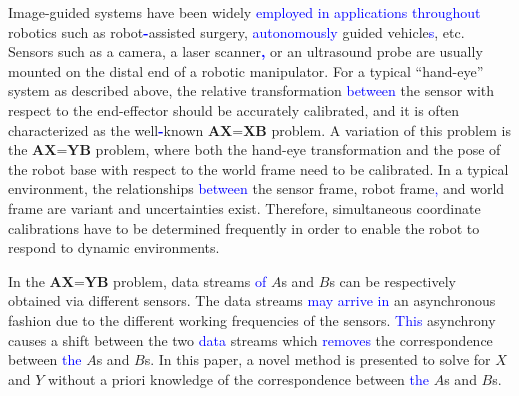 \documentclass[letterpaper, 10 pt, conference]{ieeeconf}  %
\begin{document}
Image-guided systems have been widely %
\textcolor{blue}{employed in applications throughout} %
robotics such as robot\textbf{\textcolor{blue}{-}}assisted surgery, %
\textcolor{blue}{autonomously} guided vehicle\textcolor{blue}{s}, etc. Sensors such as a camera, a laser scanner\textbf{\textcolor{blue}{,}} or an ultrasound probe are usually mounted on the distal end of a robotic manipulator. For a typical ``hand-eye'' system as described above, the relative transformation %
\textcolor{blue}{between} the sensor with respect to the end-effector should be accurately calibrated, and it is often characterized as the well\textbf{\textcolor{blue}{-}}known $\textbf{AX=XB}$ problem. A variation of this problem is the $\textbf{AX=YB}$ problem, where both the hand-eye transformation and the pose of the robot base with respect to the world frame need to be calibrated. In a typical environment, %
the relationships %
\textcolor{blue}{between} the sensor frame, robot frame\textcolor{blue}{,} and world frame are variant and %
 uncertainties exist. Therefore, simultaneous coordinate calibrations have to be determined frequently in order to enable the robot%
  to respond to dynamic environments.

In the $\textbf{AX=YB}$ problem, data streams \textcolor{blue}{of} $A$s and $B$s can be respectively obtained via different sensors. The data streams %
\textcolor{blue}{may arrive in} an asynchronous fashion due to the different working frequencies of the sensors. \textcolor{blue}{This} %
asynchrony causes a shift between the two \textcolor{blue}{data} streams %
which \textcolor{blue}{removes} %
the correspondence between \textcolor{blue}{the} $A$s and $B$s. In this paper, a novel method is presented to solve for $X$ and $Y$ without %
a priori knowledge of the correspondence between \textcolor{blue}{the} $A$s and $B$s.
\end{document}
